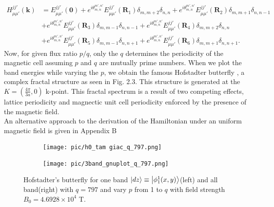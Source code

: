 \documentclass{report}
\begin{document}
\begin{equation}
	\begin{aligned}
		H_{\mu\mu'}^{jj'}(\mathbf{k})
		 & = E_{\mu\mu'}^{jj'}(\mathbf{0}) + e^{i\theta_{m,n}^{m',n'}} E_{\mu\mu'}^{jj'}(\mathbf{R}_{1}) \delta_{m,m+2}\delta_{n,n} + e^{i\theta_{m,n}^{m',n'}} E_{\mu\mu'}^{jj'}(\mathbf{R}_{2}) \delta_{m,m+1} \delta_{n,n - 1} \\
		 & + e^{i\theta_{m,n}^{m',n'}} E_{\mu\mu'}^{jj'}(\mathbf{R}_{3}) \delta_{m,m - 1} \delta_{n,n - 1} + e^{i\theta_{m,n}^{m',n'}} E_{\mu\mu'}^{jj'}(\mathbf{R}_{4}) \delta_{m,m + 2} \delta_{n,n}                            \\
		 & + e^{i\theta_{m,n}^{m',n'}} E_{\mu\mu'}^{jj'}(\mathbf{R}_{5}) \delta_{m,m - 1} \delta_{n,n + 1} + e^{i\theta_{m,n}^{m',n'}} E_{\mu\mu'}^{jj'}(\mathbf{R}_{6}) \delta_{m,m + 1} \delta_{n,n + 1}.
	\end{aligned}
\end{equation}
Now, for given flux ratio $p/q$, only the $q$ determines the periodicity of the magnetic cell assuming $p$ and $q$ are mutually prime numbers. When we plot the band energies while varying the $p$, we obtain the famous Hofstadter butterfly \cite{PhysRevB.14.2239}, a complex fractal structure as seen in Fig. 2.3. This structure is generated at the $K = (\frac{4\pi}{3a},0)$ k-point. This fractal spectrum is a result of two competing effects, lattice periodicity and magnectic unit cell periodicity enforced by the presence of the magnetic field. \\
An alternative approach to the derivation of the Hamiltonian under an uniform magnetic field is given in Appendix B
\begin{figure}[htb]
	\centering
	\begin{subfigure}[b]{0.495\textwidth}
		\centering
		\texttt{[image: pic/h0\_tam giac\_q\_797.png]}
		\label{fig:3 band}
	\end{subfigure}
	\begin{subfigure}[b]{0.495\textwidth}
		\centering
		\texttt{[image: pic/3band\_gnuplot\_q\_797.png]}
		\label{fig:1 band}
	\end{subfigure}
	\caption{
		Hofstadter’s butterfly for one band $\ket{dz} \equiv \ket{\phi_{1}^{1}(x,y)}$(left) and all band(right) with $q = 797$ and vary $p$  from 1 to $q$ with field strength $B_{0} = 4.6928 \times 10^{4}$ T.
	}
\end{figure}
\end{document}
